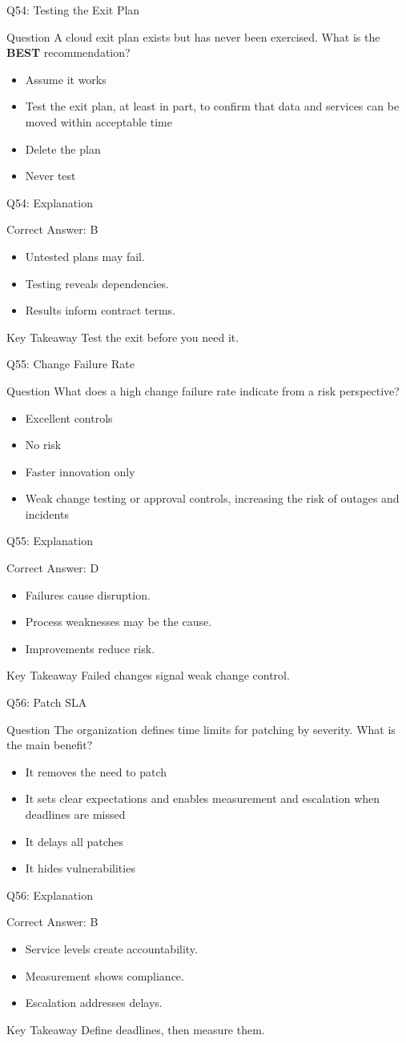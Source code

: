 \documentclass[aspectratio=169]{beamer}
\newcommand{\hq}[7]{%
	\begin{frame}{Q#1: #2}
		\begin{block}{Question}
			#3
		\end{block}
		\begin{itemize}
			#4
		\end{itemize}
	\end{frame}
	\begin{frame}{Q#1: Explanation}
		\begin{block}{Correct Answer: #5}
			\begin{itemize}
				#6
			\end{itemize}
		\end{block}
		\begin{alertblock}{Key Takeaway}
			#7
		\end{alertblock}
	\end{frame}
}
\begin{document}
	\hq{54}{Testing the Exit Plan}
	{A cloud exit plan exists but has never been exercised. What is the \textbf{BEST} recommendation?}
	{\item[\textbf{(A)}] Assume it works
		\item[\textbf{(B)}] Test the exit plan, at least in part, to confirm that data and services can be moved within acceptable time
		\item[\textbf{(C)}] Delete the plan
		\item[\textbf{(D)}] Never test}
	{B}
	{\item Untested plans may fail.
		\item Testing reveals dependencies.
		\item Results inform contract terms.}
	{Test the exit before you need it.}

	\hq{55}{Change Failure Rate}
	{What does a high change failure rate indicate from a risk perspective?}
	{\item[\textbf{(A)}] Excellent controls
		\item[\textbf{(B)}] No risk
		\item[\textbf{(C)}] Faster innovation only
		\item[\textbf{(D)}] Weak change testing or approval controls, increasing the risk of outages and incidents}
	{D}
	{\item Failures cause disruption.
		\item Process weaknesses may be the cause.
		\item Improvements reduce risk.}
	{Failed changes signal weak change control.}

	\hq{56}{Patch SLA}
	{The organization defines time limits for patching by severity. What is the main benefit?}
	{\item[\textbf{(A)}] It removes the need to patch
		\item[\textbf{(B)}] It sets clear expectations and enables measurement and escalation when deadlines are missed
		\item[\textbf{(C)}] It delays all patches
		\item[\textbf{(D)}] It hides vulnerabilities}
	{B}
	{\item Service levels create accountability.
		\item Measurement shows compliance.
		\item Escalation addresses delays.}
	{Define deadlines, then measure them.}
\end{document}
